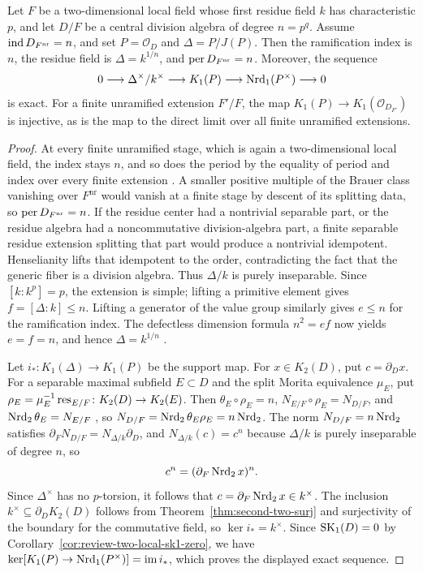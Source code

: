 \begin{lemma}
\label{lem:review-minimal-order-k1-support}
Let $F$ be a two-dimensional local field whose first residue field $k$ has characteristic $p$, and let $D/F$ be a central division algebra of degree $n=p^q$.
Assume $\operatorname{ind} D_{F^{\mathrm{nr}}}=n$, and set $P=\mathcal O_D$ and $\Delta=P/J(P)$.
Then the ramification index is $n$, the residue field is $\Delta=k^{1/n}$, and $\operatorname{per} D_{F^{\mathrm{nr}}}=n$.
Moreover, the sequence
\[
 0\longrightarrow\Delta^\times/k^\times
 \longrightarrow K_1(P)\longrightarrow
 \operatorname{Nrd}_1(P^\times)\longrightarrow0
\]
is exact.
For a finite unramified extension $F'/F$, the map $K_1(P)\to K_1(\mathcal O_{D_{F'}})$ is injective, as is the map to the direct limit over all finite unramified extensions.
\end{lemma}
\begin{proof}
At every finite unramified stage, which is again a two-dimensional local field, the index stays $n$, and so does the period by the equality of period and index over every finite extension \cite[Corollary 5.1, Proposition 5.2]{Chipchakov2022}.
A smaller positive multiple of the Brauer class vanishing over $F^{\mathrm{nr}}$ would vanish at a finite stage by descent of its splitting data, so $\operatorname{per} D_{F^{\mathrm{nr}}}=n$.
If the residue center had a nontrivial separable part, or the residue algebra had a noncommutative division-algebra part, a finite separable residue extension splitting that part would produce a nontrivial idempotent.
Henselianity lifts that idempotent to the order, contradicting the fact that the generic fiber is a division algebra.
Thus $\Delta/k$ is purely inseparable.
Since $[k:k^p]=p$, the extension is simple; lifting a primitive element gives $f=[\Delta:k]\le n$.
Lifting a generator of the value group similarly gives $e\le n$ for the ramification index.
The defectless dimension formula $n^2=ef$ now yields $e=f=n$, and hence $\Delta=k^{1/n}$ \cite{WadsworthValuation}.

Let $i_*:K_1(\Delta)\to K_1(P)$ be the support map.
For $x\in K_2(D)$, put $c=\partial_Dx$.
For a separable maximal subfield $E\subset D$ and the split Morita equivalence $\mu_E$, put $\rho_E=\mu_E^{-1}\operatorname{res}_{E/F}\colon K_2(D)\to K_2(E)$.
Then $\theta_E\circ\rho_E=n$, $N_{E/F}\circ\rho_E=N_{D/F}$, and $\operatorname{Nrd}_2\theta_E=N_{E/F}$ \cite[Proposition 6.6.1(1)]{KahnLevine2010}, so $N_{D/F}=\operatorname{Nrd}_2\theta_E\rho_E=n\operatorname{Nrd}_2$.
The norm $N_{D/F}=n\operatorname{Nrd}_2$ satisfies $\partial_FN_{D/F}=N_{\Delta/k}\partial_D$, and $N_{\Delta/k}(c)=c^n$ because $\Delta/k$ is purely inseparable of degree $n$, so
\[
 c^n=(\partial_F\operatorname{Nrd}_2x)^n.
\]
Since $\Delta^\times$ has no $p$-torsion, it follows that $c=\partial_F\operatorname{Nrd}_2x\in k^\times$.
The inclusion $k^\times\subseteq\partial_DK_2(D)$ follows from Theorem~\ref{thm:second-two-surj} and surjectivity of the boundary for the commutative field, so $\ker i_*=k^\times$.
Since $\operatorname{SK}_1(D)=0$ by Corollary~\ref{cor:review-two-local-sk1-zero}, we have $\ker[K_1(P)\to\operatorname{Nrd}_1(P^\times)]=\operatorname{im} i_*$, which proves the displayed exact sequence.


\end{proof}

